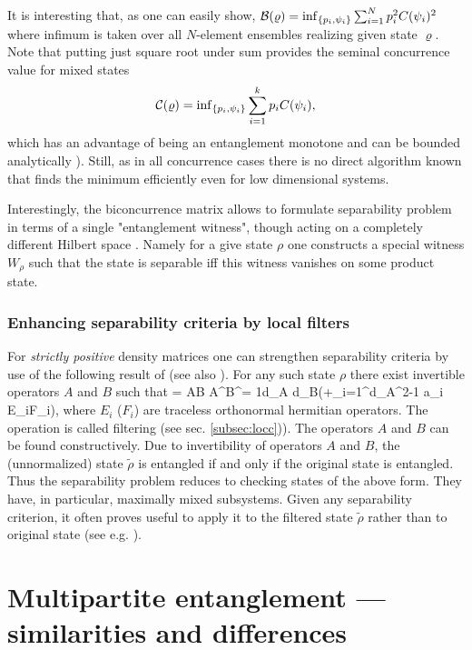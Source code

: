 \documentclass[rmp,12pt,preprint]{revtex4-2}
\begin{document}
It is interesting that, as one can easily show, ${\cal
B}(\varrho)=\inf_{\{p_{i},\psi_{i}\}}
\sum_{i=1}^{N} p_{i}^{2}C(\psi_{i})^{2}$ where infimum is taken over
all $N$-element ensembles realizing given state $\varrho$.
Note that putting just
square root under sum provides the seminal concurrence value
for mixed states
\begin{equation}
{\cal
  C}(\varrho)={\inf}_{\{p_{i},\psi_{i}\}}
\sum_{i=1}^{k}p_{i}C(\psi_{i}),
\end{equation}
which has an advantage of being an
entanglement monotone and can be bounded analytically
\cite{MintertKB04-conc}).  Still, as in all concurrence cases
there is no direct algorithm known that finds the minimum efficiently
even for low dimensional systems.

Interestingly, the biconcurrence matrix allows to formulate separability problem in terms of a single "entanglement witness", though acting on a completely different Hilbert space
\cite{BadziagHHA-single-wit-2007}. Namely for a give state $\rho$ one constructs a special witness $W_{\rho}$ such that the state is separable iff this witness vanishes on some product state.

\subsubsection{Enhancing separability criteria by local filters}
For {\it strictly positive} density matrices one can strengthen separability criteria
by use of the following result of \cite{LeinaasMO2006}  (see also \cite{VerstraeteDM2003}).
For any such state $\rho$ there exist invertible operators $A$ and $B$ such
that
\be
\tilde \rho = A\ot B \rho A^\dagger \ot B^\dagger=
{1\over d_A d_B}(\id +\sum_{i=1}^{d_A^2-1} a_i E_i\ot F_i),
\ee
where $E_i$ ($F_i$) are traceless orthonormal hermitian operators. The operation is called filtering (see sec. \ref{subsec:locc})).
The operators $A$  and $B$ can be found constructively.
Due to invertibility  of operators $A$ and $B$, the (unnormalized) state $\tilde\rho$ is entangled if and only if the original state
is entangled. Thus the separability problem reduces to checking states of the above form.
They have, in particular, maximally mixed subsystems. Given any separability criterion,  it often proves
useful to apply it to the filtered state $\tilde \rho$ rather than to original state (see e.g. \cite{GuhneHGE2007}).





\section{Multipartite entanglement --- similarities and differences}
\label{MultipartiteEntanglement}
\end{document}

